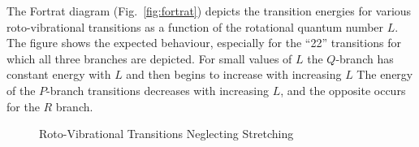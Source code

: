 The Fortrat diagram (Fig.~\ref{fig:fortrat})
depicts the transition energies for various roto-vibrational
transitions as a function of the rotational quantum number $L$.  The
figure shows the expected behaviour, especially for the ``22''
transitions for which all three branches are depicted.  For small
values of $L$ the $Q$-branch has constant energy with $L$ and then
begins to increase with increasing $L$  The energy of the $P$-branch
transitions decreases with increasing $L$, and the opposite occurs
for the $R$ branch.

\begin{figure}
\begin{center}
\end{center}
\caption{Roto-Vibrational Transitions Neglecting Stretching}
\label{fig:molecule_trans}
\end{figure}

